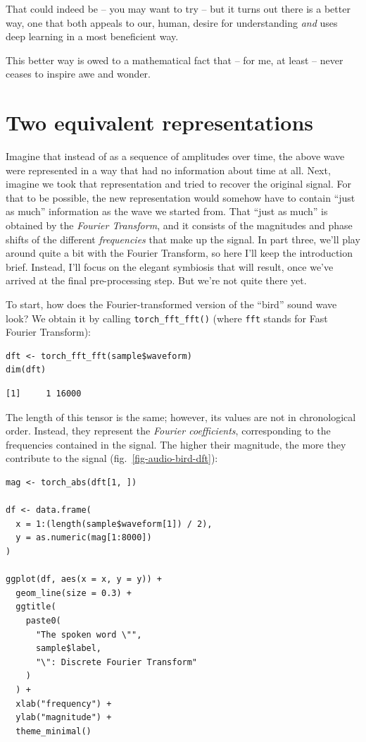\documentclass[
  letterpaper,
]{krantz}
\begin{document}
That could indeed be -- you may want to try -- but it turns out there is
a better way, one that both appeals to our, human, desire for
understanding \emph{and} uses deep learning in a most beneficient way.

This better way is owed to a mathematical fact that -- for me, at least
-- never ceases to inspire awe and wonder.

\hypertarget{two-equivalent-representations}{%
\section{Two equivalent
representations}\label{two-equivalent-representations}}

Imagine that instead of as a sequence of amplitudes over time, the above
wave were represented in a way that had no information about time at
all. Next, imagine we took that representation and tried to recover the
original signal. For that to be possible, the new representation would
somehow have to contain ``just as much'' information as the wave we
started from. That ``just as much'' is obtained by the \emph{Fourier
Transform}, and it consists of the magnitudes and phase shifts of the
different \emph{frequencies} that make up the signal. In part three,
we'll play around quite a bit with the Fourier Transform, so here I'll
keep the introduction brief. Instead, I'll focus on the elegant
symbiosis that will result, once we've arrived at the final
pre-processing step. But we're not quite there yet.

To start, how does the Fourier-transformed version of the ``bird'' sound
wave look? We obtain it by calling \texttt{torch\_fft\_fft()} (where
\texttt{fft} stands for Fast Fourier Transform):

\begin{verbatim}
dft <- torch_fft_fft(sample$waveform)
dim(dft)
\end{verbatim}

\begin{verbatim}
[1]     1 16000
\end{verbatim}

The length of this tensor is the same; however, its values are not in
chronological order. Instead, they represent the \emph{Fourier
coefficients}, corresponding to the frequencies contained in the signal.
The higher their magnitude, the more they contribute to the signal
(fig.~\ref{fig-audio-bird-dft}):

\begin{verbatim}
mag <- torch_abs(dft[1, ])

df <- data.frame(
  x = 1:(length(sample$waveform[1]) / 2),
  y = as.numeric(mag[1:8000])
)

ggplot(df, aes(x = x, y = y)) +
  geom_line(size = 0.3) +
  ggtitle(
    paste0(
      "The spoken word \"",
      sample$label,
      "\": Discrete Fourier Transform"
    )
  ) +
  xlab("frequency") +
  ylab("magnitude") +
  theme_minimal()
\end{verbatim}
\end{document}
